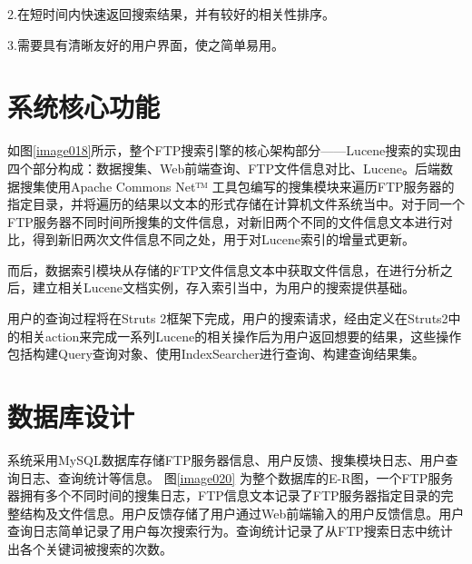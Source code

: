 2.在短时间内快速返回搜索结果，并有较好的相关性排序。

3.需要具有清晰友好的用户界面，使之简单易用。
\section{系统核心功能}
如图\ref{image018}所示，整个FTP搜索引擎的核心架构部分——Lucene搜索的实现由四个部分构成：数据搜集、Web前端查询、FTP文件信息对比、Lucene。后端数据搜集使用Apache Commons Net™ 工具包编写的搜集模块来遍历FTP服务器的指定目录，并将遍历的结果以文本的形式存储在计算机文件系统当中。对于同一个FTP服务器不同时间所搜集的文件信息，对新旧两个不同的文件信息文本进行对比，得到新旧两次文件信息不同之处，用于对Lucene索引的增量式更新。

而后，数据索引模块从存储的FTP文件信息文本中获取文件信息，在进行分析之后，建立相关Lucene文档实例，存入索引当中，为用户的搜索提供基础。

用户的查询过程将在Struts 2框架下完成，用户的搜索请求，经由定义在Struts2中的相关action来完成一系列Lucene的相关操作后为用户返回想要的结果，这些操作包括构建Query查询对象、使用IndexSearcher进行查询、构建查询结果集。


\section{数据库设计}
系统采用MySQL数据库存储FTP服务器信息、用户反馈、搜集模块日志、用户查询日志、查询统计等信息。
图\ref{image020} 为整个数据库的E-R图，一个FTP服务器拥有多个不同时间的搜集日志，FTP信息文本记录了FTP服务器指定目录的完整结构及文件信息。用户反馈存储了用户通过Web前端输入的用户反馈信息。用户查询日志简单记录了用户每次搜索行为。查询统计记录了从FTP搜索日志中统计出各个关键词被搜索的次数。
\newpage
{}

